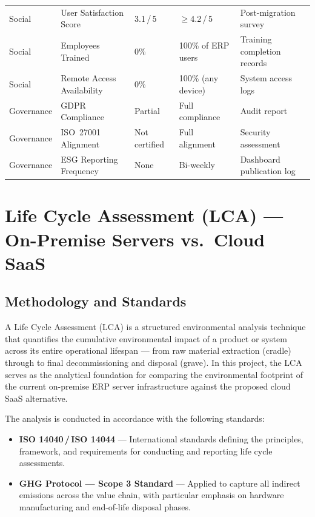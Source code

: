 \begin{longtable}{%
  p{2.2cm}
  p{3.5cm}
  p{2.2cm}
  p{2.2cm}
  p{3.0cm}}
  Social &
  User Satisfaction Score &
  3.1\,/\,5 &
  $\geq$4.2\,/\,5 &
  Post-migration survey \\

\rowcolor{rowalt}
  Social &
  Employees Trained &
  0\% &
  100\% of ERP users &
  Training completion records \\

  Social &
  Remote Access Availability &
  0\% &
  100\% (any device) &
  System access logs \\

\rowcolor{rowalt}
  Governance &
  GDPR Compliance &
  Partial &
  Full compliance &
  Audit report \\

  Governance &
  ISO~27001 Alignment &
  Not certified &
  Full alignment &
  Security assessment \\

\rowcolor{rowalt}
  Governance &
  ESG Reporting Frequency &
  None &
  Bi-weekly &
  Dashboard publication log \\

\bottomrule
\end{longtable}

\newpage


\chapter{Life Cycle Assessment (LCA) --- On-Premise Servers vs.\ Cloud SaaS}

\section{Methodology and Standards}

A Life Cycle Assessment (LCA) is a structured environmental analysis
technique that quantifies the cumulative environmental impact of a product
or system across its entire operational lifespan --- from raw material
extraction (cradle) through to final decommissioning and disposal (grave).
In this project, the LCA serves as the analytical foundation for comparing
the environmental footprint of the current on-premise ERP server
infrastructure against the proposed cloud SaaS alternative.

The analysis is conducted in accordance with the following standards:
\begin{itemize}[label=\textcolor{midgreen}{$\bullet$}]
  \item \textbf{ISO 14040\,/\,ISO 14044} --- International standards
    defining the principles, framework, and requirements for conducting
    and reporting life cycle assessments.
  \item \textbf{GHG Protocol --- Scope 3 Standard} --- Applied to capture
    all indirect emissions across the value chain, with particular
    emphasis on hardware manufacturing and end-of-life disposal phases.
\end{itemize}

